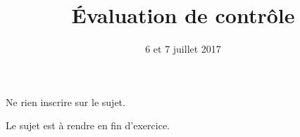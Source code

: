 \documentclass[12pt,a4paper,french]{article}
\author{}
\title{Évaluation de contrôle}
\date{6 et 7 juillet 2017}
\begin{document}
\maketitle
\begin{center}Ne rien inscrire sur le sujet.

  Le sujet est à rendre en fin d'exercice.
\end{center}

\end{document}
